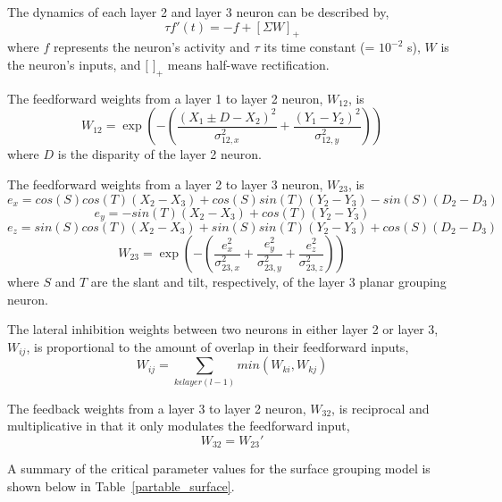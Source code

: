 The dynamics of each layer 2 and layer 3 neuron can be described by,
\begin{equation}
\tau f'(t) = -f + [\Sigma W]_+
\end{equation}
where $f$ represents the neuron's activity and $\tau$ its time constant (= $10^{-2}$ s), $W$ is the neuron's inputs, and $[$ $ ]_+$ means half-wave rectification.

The feedforward weights from a layer 1 to layer 2 neuron, $W_{12}$, is
\begin{equation}
W_{12} = \exp(-(\frac{(X_1 \pm D-X_2)^2}{\sigma_{12,x}^2}+\frac{(Y_1-Y_2)^2}{\sigma_{12,y}^2}))
\end{equation}
where $D$ is the disparity of the layer 2 neuron.

The feedforward weights from a layer 2 to layer 3 neuron, $W_{23}$, is
\begin{equation}
e_x= cos(S)cos(T)(X_2-X_3)+cos(S)sin(T)(Y_2-Y_3)-sin(S)(D_2-D_3)
\end{equation}
\begin{equation}
e_y= -sin(T)(X_2-X_3)+cos(T)(Y_2-Y_3)
\end{equation}
\begin{equation}
e_z= sin(S)cos(T)(X_2-X_3)+sin(S)sin(T)(Y_2-Y_3)+cos(S)(D_2-D_3)
\end{equation}
\begin{equation}
W_{23} = \exp(-(\frac{e_x^2}{\sigma_{23,x}^2}+\frac{e_y^2}{\sigma_{23,y}^2}+\frac{e_z^2}{\sigma_{23,z}^2})) 
\end{equation}
where $S$ and $T$ are the slant and tilt, respectively, of the layer 3 planar grouping neuron.

The lateral inhibition weights between two neurons in either layer 2 or layer 3, $W_{ij}$, is proportional to the amount of overlap in their feedforward inputs,
\begin{equation}
W_{ij} = \sum\limits_{k \epsilon layer(l-1)} min(W_{ki}, W_{kj})
\end{equation}

The feedback weights from a layer 3 to layer 2 neuron, $W_{32}$, is reciprocal and multiplicative in that it only modulates the feedforward input,
\begin{equation}
W_{32} = W_{23}'
\end{equation}

A summary of the critical parameter values for the surface grouping model is shown below in Table~\ref{partable_surface}.

